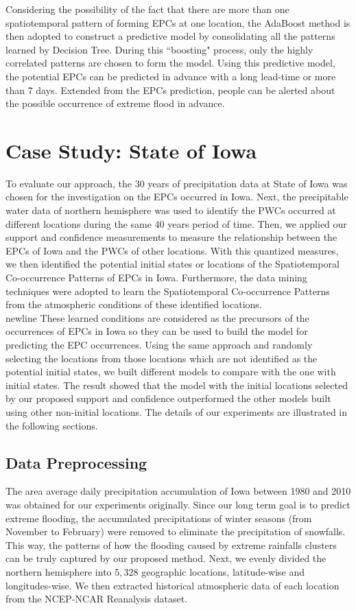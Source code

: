 \documentclass{acm_proc_article-sp}
\begin{document}
\newline 
Considering the possibility of the fact that there are more than one spatiotemporal pattern of forming EPCs at one location, the AdaBoost method is then adopted to construct a predictive model by consolidating all the patterns learned by Decision Tree. During this ``boosting" process, only the highly correlated patterns are chosen to form the model. Using this predictive model, the potential EPCs can be predicted in advance with a long lead-time or more than 7 days. Extended from the EPCs prediction, people can be alerted about the possible occurrence of extreme flood in advance.   

\section{Case Study: State of Iowa}
\label{sec:CaseStudy}
To evaluate our approach, the 30 years of precipitation data at State of Iowa was chosen for the investigation on the EPCs occurred in Iowa. Next, the precipitable water data of northern hemisphere was used to identify the PWCs occurred at different locations during the same 40 years period of time. Then, we applied our support and confidence measurements to measure the relationship between the EPCs of Iowa and the PWCs of other locations. With this quantized measures, we then identified the potential initial states or locations of the Spatiotemporal Co-occurrence Patterns of EPCs in Iowa. Furthermore, the data mining techniques were adopted to learn the Spatiotemporal Co-occurrence Patterns from the atmospheric conditions of these identified locations. 
\\newline 
These learned conditions are considered as the precursors of the occurrences of EPCs in Iowa so they can be used to build the model for predicting the EPC occurrences. Using the same approach and randomly selecting the locations from those locations which are not identified as the potential initial states, we built different models to compare with the one with initial states. The result showed that the model with the initial locations selected by our proposed support and confidence outperformed the other models built using other non-initial locations. The details of our experiments are illustrated in the following sections. 
\subsection{Data Preprocessing}   
The area average daily precipitation accumulation of Iowa between 1980 and 2010 was obtained for our experiments originally. Since our long term goal is to predict extreme flooding, the accumulated precipitations of winter seasons (from November to February) were removed to eliminate the precipitation of snowfalls. This way, the patterns of how the flooding caused by extreme rainfalls clusters can be truly captured by our proposed method.     
\newline
Next, we evenly divided the northern hemisphere into $5,328$ geographic locations, latitude-wise and longitudes-wise. We then extracted historical atmospheric data of each location from the NCEP-NCAR Reanalysis dataset\cite{kalnay1996ncep}.       
\end{document}
